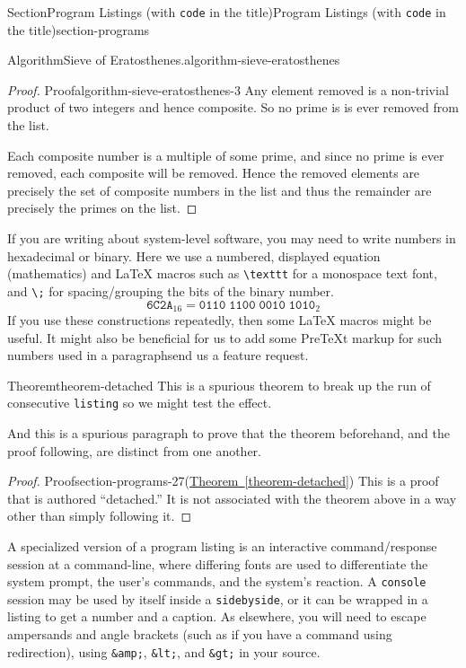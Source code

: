 \documentclass[twoside,10pt,]{article}
\newcommand{\xreffont}{\relax}
\newcommand{\mono}[1]{\texttt{#1}}
\numberwithin{equation}{section}
\begin{document}
\begin{sectionptx}{Section}{Program Listings (with \mono{code} in the title)}{}{Program Listings (with \mono{code} in the title)}{}{}{section-programs}
\begin{algorithm}{Algorithm}{Sieve of Eratosthenes.}{}{algorithm-sieve-eratosthenes}
%
\end{algorithm}
\begin{proof}{Proof}{}{algorithm-sieve-eratosthenes-3}
Any element removed is a non-trivial product of two integers and hence composite.  So no prime is is ever removed from the list.%
\par
Each composite number is a multiple of some prime, and since no prime is ever removed, each composite will be removed.  Hence the removed elements are precisely the set of composite numbers in the list and thus the remainder are precisely the primes on the list.%
\end{proof}
If you are writing about system-level software, you may need to write numbers in hexadecimal or binary.  Here we use a numbered, displayed equation (mathematics) and \LaTeX{} macros such as \mono{\textbackslash{}texttt} for a monospace text font, and \mono{\textbackslash{};} for spacing\slash{}grouping the bits of the binary number.%
\begin{equation}
\texttt{6C2A}_{16} = \texttt{0110}\;\texttt{1100}\;\texttt{0010}\;\texttt{1010}_{2}\label{section-programs-24-4}
\end{equation}
If you use these constructions repeatedly, then some \LaTeX{} macros might be useful.  It might also be beneficial for us to add some PreTeXt markup for such numbers used in a paragraph\textemdash{}send us a feature request.%
\begin{theorem}{Theorem}{}{}{theorem-detached}%
This is a spurious theorem to break up the run of consecutive \mono{listing} so we might test the effect.%
\end{theorem}
And this is a spurious paragraph to prove that the theorem beforehand, and the proof following, are distinct from one another.%
\begin{proof}{Proof}{}{section-programs-27}\space(\hyperref[theorem-detached]{Theorem~{\xreffont\ref{theorem-detached}}})\space
This is a proof that is authored ``detached.''  It is not associated with the theorem above in a way other than simply following it.%
\end{proof}
A specialized version of a program listing is an interactive command\slash{}response session at a command-line, where differing fonts are used to differentiate the system prompt, the user's commands, and the system's reaction.  A   \mono{console} session may be used by itself inside a \mono{sidebyside}, or it can be wrapped in a listing to get a number and a caption.  As elsewhere, you will need to escape ampersands and angle brackets (such as if you have a command using redirection), using \mono{\&amp;}, \mono{\&lt;}, and \mono{\&gt;} in your source.%

\end{sectionptx}
\end{document}
